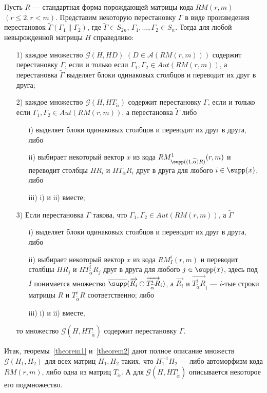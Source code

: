 \begin{theorem}\label{theorem2}
Пусть $R$ --- стандартная форма порождающей матрицы кода $RM(r,m)$
$(r\leqslant 2,r<m)$. Представим некоторую перестановку $\Gamma$ в
виде произведения перестановок
$\widetilde\Gamma(\Gamma_1\|\Gamma_2)$, где $\widetilde\Gamma\in
S_{2n}$, $\Gamma_1,\ldots,\Gamma_2\in S_n$. Тогда для любой
невырожденной матрицы $H$ справедливо:
\begin{itemize}
\item[1)] каждое множество $\mathcal G(H,HD)$ $(D\in \mathcal A(RM(r,m)))$
содержит перестановку  $\Gamma$, если и только если
$\Gamma_1,\Gamma_2\in Aut(RM(r,m))$, а перестановка
$\widetilde\Gamma$ выделяет блоки одинаковых столбцов и переводит их
друг в друга;
\item[2)] каждое множество $\mathcal G(H,HT_{\widetilde\alpha})$
содержит перестановку  $\Gamma$, если и только если
$\Gamma_1,\Gamma_2\in Aut(RM(r,m))$, а перестановка
$\widetilde\Gamma$ либо
\begin{itemize}
\item[i)]выделяет блоки одинаковых столбцов и переводит их друг в
друга, либо
\item[ii)]выбирает некоторый вектор $x$ из кода
$RM^1_{\supp((1,\widetilde\alpha)R)}(r,m)$ и переводит столбцы
$HR_i$ и $HT_{\widetilde\alpha}R_i$ друг в друга для любого $i\in
\supp(x)$, либо
\item[iii)] i) и ii) вместе;
\end{itemize}
\item[3)] Если перестановка $\Gamma$ такова, что $\Gamma_1,\Gamma_2\in
Aut(RM(r,m))$, а $\widetilde\Gamma$
\begin{itemize}
\item[i)]выделяет блоки одинаковых столбцов и переводит их друг в
друга, либо
\item[ii)]выбирает некоторый вектор $x$ из кода
$RM^i_{I}(r,m)$ и переводит столбцы $HR_j$ и
$HT^{i}_{\widetilde\alpha}R_j$ друг в друга для любого $j\in
\supp(x)$, здесь под $I$ понимается множество
$\overline{\supp}(\overrightarrow{R_i}\oplus
\overrightarrow{T^{i}_{\widetilde\alpha}R}_i)$, а
$\overrightarrow{R_i}$ и
$\overrightarrow{T^{i}_{\widetilde\alpha}R}_i$ --- $i$-тые строки
матрицы $R$ и $T^{i}_{\widetilde\alpha}R$ соответственно; либо
\item[iii)] i) и ii) вместе,
\end{itemize}
то множество $\mathcal G(H,HT^i_{\widetilde\alpha})$ содержит
перестановку $\Gamma$.
\end{itemize}
\end{theorem}

Итак, теоремы~\ref{theorem1} и~\ref{theorem2} дают полное описание
множеств $\mathcal G(H_1,H_2)$ для всех матриц $H_1,H_2$ таких,
что $H^{-1}_1H_2$ --- либо автоморфизм кода $RM(r,m)$, либо одна
из матриц $T_{\widetilde\alpha}$. А для $\mathcal
G(H,HT^i_{\widetilde\alpha})$ описывается некоторое его
подмножество.
